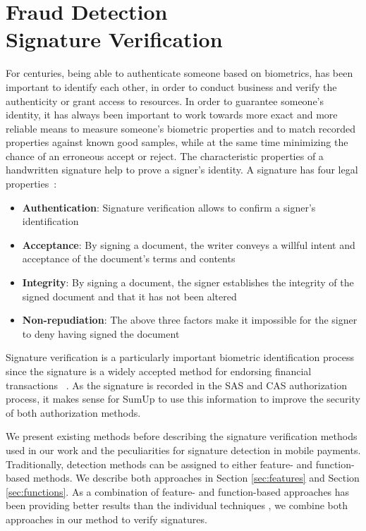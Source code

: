 \documentclass[a4paper, oneside]{csthesis}
\begin{document}

\chapter{Fraud Detection \\Signature Verification}
\label{chp:signature-verification}

For centuries, being able to authenticate someone based on biometrics, has been important to identify each other, in order to conduct business and verify the authenticity or grant access to resources. In order to guarantee someone's identity, it has always been important to work towards more exact and more reliable means to measure someone's biometric properties and to match recorded properties against known good samples, while at the same time minimizing the chance of an erroneous accept or reject. The characteristic properties of a handwritten signature help to prove a signer's identity. A signature has four legal properties~\cite{Hanmandlu05}:

\begin{itemize}
\item \textbf{Authentication}: Signature verification allows to confirm a signer's identification
\item \textbf{Acceptance}: By signing a document, the writer conveys a willful intent and acceptance of the document's terms and contents
\item \textbf{Integrity}: By signing a document, the signer establishes the integrity of the signed document and that it has not been altered
\item \textbf{Non-repudiation}: The above three factors make it impossible for the signer to deny having signed the document
\end{itemize}

Signature verification is a particularly important biometric identification process since the signature is a widely accepted method for endorsing financial transactions ~\cite{1227706}.
As the signature is recorded in the SAS and CAS authorization process, it makes sense for SumUp to use this information to improve the security of both authorization methods.

We present existing methods before describing the signature verification methods used in our work and the peculiarities for signature detection in mobile payments.
Traditionally, detection methods can be assigned to either feature- and function-based methods. We describe both approaches in Section \ref{sec:features} and Section \ref{sec:functions}. As a combination of feature- and function-based approaches has been providing better results than the individual techniques \cite{fierrez2005line}, we combine both approaches in our method to verify signatures.
\end{document}
